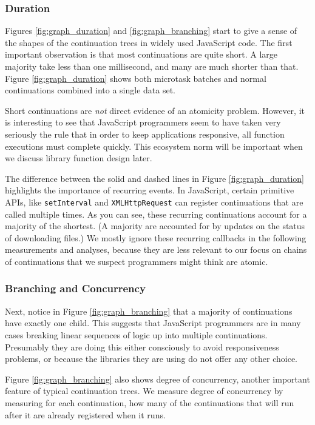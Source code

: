 \documentclass[sigplan,10pt,review,anonymous]{acmart}\settopmatter{printfolios=true,printccs=false,printacmref=false}
\begin{document}
\subsubsection{Duration}

Figures \ref{fig:graph_duration} and \ref{fig:graph_branching} start to give a sense of the shapes of the continuation trees in widely used JavaScript code.
The first important observation is that most continuations are quite short.
A large majority take less than one millisecond, and many are much shorter than that.
Figure \ref{fig:graph_duration} shows both microtask batches and normal continuations combined into a single data set.

Short continuations are \emph{not} direct evidence of an atomicity problem.
However, it is interesting to see that JavaScript programmers seem to have taken very seriously the rule that in order to keep applications responsive, all function executions must complete quickly.
This ecosystem norm will be important when we discuss library function design later.

The difference between the solid and dashed lines in Figure \ref{fig:graph_duration} highlights the importance of recurring events.
In JavaScript, certain primitive APIs, like \texttt{setInterval} and \texttt{XMLHttpRequest} can register continuations that are called multiple times.
As you can see, these recurring continuations account for a majority of the shortest.
(A majority are accounted for by updates on the status of downloading files.)
We mostly ignore these recurring callbacks in the following measurements and analyses, because they are less relevant to our focus on chains of continuations that we suspect programmers might think are atomic.

\subsubsection{Branching and Concurrency}

Next, notice in Figure \ref{fig:graph_branching} that a majority of continuations have exactly one child.
This suggests that JavaScript programmers are in many cases breaking linear sequences of logic up into multiple continuations.
Presumably they are doing this either consciously to avoid responsiveness problems, or because the libraries they are using do not offer any other choice.

Figure \ref{fig:graph_branching} also shows degree of concurrency, another important feature of typical continuation trees.
We measure degree of concurrency by measuring for each continuation, how many of the continuations that will run after it are already registered when it runs.
\end{document}
